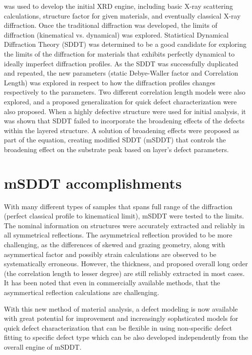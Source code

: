 \MathLogo was used to develop the initial XRD engine, including basic X-ray scattering calculations, structure factor for given materials, and eventually classical X-ray diffraction.  Once the traditional diffraction was developed, the limits of diffraction (kinematical vs. dynamical) was explored.  Statistical Dynamical Diffraction Theory (SDDT) was determined to be a good candidate for exploring the limits of the diffraction for materials that exhibits perfectly dynamical to ideally imperfect diffraction profiles.  As the SDDT was successfully duplicated and repeated, the new parameters (static Debye-Waller factor and Correlation Length) was explored in respect to how the diffraction profiles changes respectively to the parameters.  Two different correlation length models were also explored, and a proposed generalization for quick defect characterization were also proposed.  When a highly defective structure were used for initial analysis, it was shown that SDDT failed to incorporate the broadening effects of the defects within the layered structure.  A solution of broadening effects were proposed as part of the equation, creating modified SDDT (mSDDT) that controls the broadening effect on the substrate peak based on layer's defect parameters.

\section{mSDDT accomplishments}

With many different types of samples that spans full range of the diffraction (perfect classical profile to kinematical limit), mSDDT were tested to the limits.  The nominal information on structures were accurately extracted and reliably in all symmetrical reflections. The asymmetrical reflection provided to be more challenging, as the differences of skewed and grazing geometry, along with asymmertical factor and possibly strain calculations are observed to be systematically erroneous.  However, the thickness, and proposed overall long order (the correlation length to lesser degree) are still reliably extracted in most cases.  It has been noted that even in commercially available methods, that the asymmertical reflection calculations are challenging.

With this new method of material analysis, a defect modeling is now available with great potential for improvement and increasingly sophsticated models for quick defect characterization that can be flexible in using non-specific defect fitting to specific defect type which can be also developed independently from the overall engine of mSDDT.

